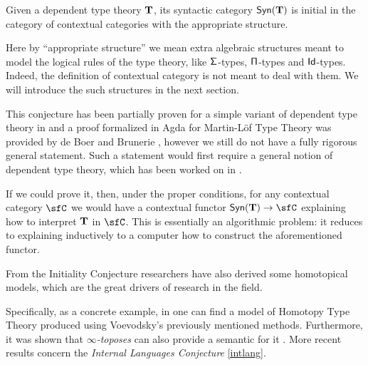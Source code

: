 \begin{named}[Initiality]\label{initconj}
  Given a dependent type theory $\operatorname{\mathbf{T}}$, its syntactic category $\mathsf{Syn}(\mathbf{\operatorname{\mathbf{T}}})$ is
  initial in the category of contextual categories with the appropriate
  structure.
\end{named}

\begin{rmk}
Here by ``appropriate structure'' we mean extra algebraic structures meant to
model the
logical rules of the type theory, like $\operatorname{\mathsf{\Sigma}}$-types, $\operatorname{\mathsf{\Pi}}$-types and
$\operatorname{\mathsf{Id}}$-types. Indeed, the definition of contextual category is not meant to deal
with them. We will introduce the such structures in the next section.
\end{rmk}

\begin{rmk}
This conjecture has been partially proven for a simple variant of dependent type
theory in \cite{Str91} and a proof formalized in Agda
for Martin-L\"{o}f Type Theory was provided by de Boer and Brunerie
\cite{Boe20}, however we still do not have a fully
rigorous general statement. Such a statement would first require a general
notion of dependent type theory,
which has been worked on in \cite{Isa17, Uem19, Bru20, BHL20, NU22}. 
\end{rmk}

\noindent
If we could prove it, then, under the proper conditions,
for any contextual category $\sfC$ we would have a
contextual functor $\Syn{\T}\rightarrow\sfC$ explaining how to interpret $\operatorname{\mathbf{T}}$ in
$\sfC$. This is essentially an algorithmic problem: it reduces to explaining
inductively to a computer how to construct the aforementioned functor.

\begin{rmk}\label{internal}
  From the Initiality Conjecture researchers have also derived some homotopical
  models, which are the great drivers
  of research in the field.

  \noindent
  Specifically, as a concrete example, in \cite{KL12} one can find a model of
  Homotopy Type Theory produced using Voevodsky's previously mentioned methods.
  Furthermore, it was shown that \emph{$\infty$-toposes} can also provide a
  semantic for it \cite{Shu19}. More recent results concern the \emph{Internal
  Languages Conjecture} \ref{intlang}.
\end{rmk}

